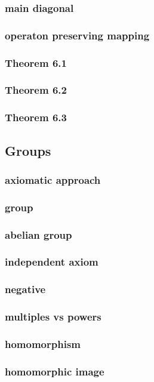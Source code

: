 \documentclass[a4paper]{article}
\begin{document}
\subsubsection*{main diagonal}
\subsubsection*{operaton preserving mapping}
\subsubsection*{Theorem 6.1}
\subsubsection*{Theorem 6.2}
\subsubsection*{Theorem 6.3}

\newpage
\subsection{Groups}   %
\subsubsection*{axiomatic approach}
\subsubsection*{group}
\subsubsection*{abelian group}
\subsubsection*{independent axiom}
\subsubsection*{negative}
\subsubsection*{multiples vs powers}
\subsubsection*{homomorphism}
\subsubsection*{homomorphic image}
\end{document}
